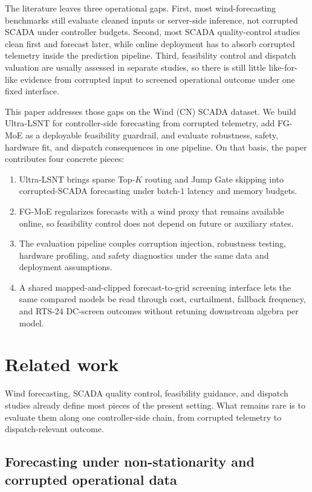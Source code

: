 ﻿\documentclass[review,1p,times]{elsarticle}
\begin{document}
The literature leaves three operational gaps. First, most wind-forecasting benchmarks still evaluate cleaned inputs or server-side inference, not corrupted SCADA under controller budgets. Second, most SCADA quality-control studies clean first and forecast later, while online deployment has to absorb corrupted telemetry inside the prediction pipeline. Third, feasibility control and dispatch valuation are usually assessed in separate studies, so there is still little like-for-like evidence from corrupted input to screened operational outcome under one fixed interface.

This paper addresses those gaps on the Wind (CN) SCADA dataset. We build Ultra-LSNT for controller-side forecasting from corrupted telemetry, add FG-MoE as a deployable feasibility guardrail, and evaluate robustness, safety, hardware fit, and dispatch consequences in one pipeline. On that basis, the paper contributes four concrete pieces:
\begin{enumerate}
\item Ultra-LSNT brings sparse Top-$K$ routing and Jump Gate skipping into corrupted-SCADA forecasting under batch-$1$ latency and memory budgets.
\item FG-MoE regularizes forecasts with a wind proxy that remains available online, so feasibility control does not depend on future or auxiliary states.
\item The evaluation pipeline couples corruption injection, robustness testing, hardware profiling, and safety diagnostics under the same data and deployment assumptions.
\item A shared mapped-and-clipped forecast-to-grid screening interface lets the same compared models be read through cost, curtailment, fallback frequency, and RTS-24 DC-screen outcomes without retuning downstream algebra per model.
\end{enumerate}

\section{Related work}
\label{sec:related}

Wind forecasting, SCADA quality control, feasibility guidance, and dispatch studies already define most pieces of the present setting. What remains rare is to evaluate them along one controller-side chain, from corrupted telemetry to dispatch-relevant outcome.

\subsection{Forecasting under non-stationarity and corrupted operational data}
\label{subsec:related_scada}\label{subsec:related_nonstationary}
\end{document}
